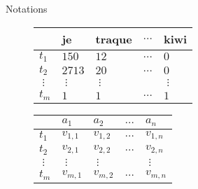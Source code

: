 \documentclass[../allslides.tex]{subfiles}
\begin{document}
\begin{frame}[fragile]{Notations}
	\begin{overprint}
			\begin{figure}
				\begin{tabu} to 0.9
							& je     & traque     & $…$ & kiwi\\
					\hline
					$t_1$   & $150$ & $12$ & $…$ & $0$\\
					$t_2$   & $2713$ & $20$ & $…$ & $0$\\
					$⋮$    & $⋮$      & $⋮$       &     & $⋮$\\
					$t_m$   & $1$ & $1$ & $…$ & $1$\\
				 \end{tabu}
			\end{figure}
			\begin{figure}
				\begin{tabu} to 0.9
							& $a_1$     & $a_2$     & $…$ & $a_n$\\
					\hline
					$t_1$   & $v_{1,1}$ & $v_{1,2}$ & $…$ & $v_{1,n}$\\
					$t_2$   & $v_{2,1}$ & $v_{2,2}$ & $…$ & $v_{2,n}$\\
					$⋮$    & $⋮$      & $⋮$       &     & $⋮$\\
					$t_m$   & $v_{m,1}$ & $v_{m,2}$ & $…$ & $v_{m,n}$\\
				 \end{tabu}
			\end{figure}
	\end{overprint}

\end{frame}

\end{document}
